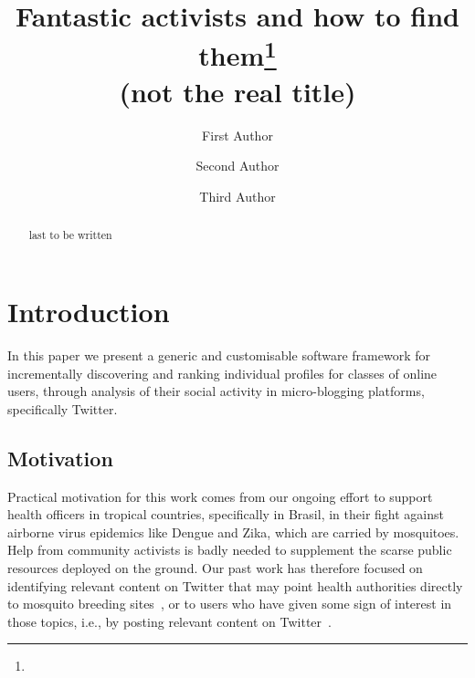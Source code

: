 \documentclass[runningheads]{llncs}
\begin{document}
%
\title{Fantastic activists and how to find them\thanks{} \\ \small (not the real title)}
%
%
\author{First Author \and
Second Author \and
Third Author}
%
%
%
\maketitle              %
%
\begin{abstract}
last to be written
\end{abstract}
%

%
%
\section{Introduction}

In this paper we present a generic and customisable software  framework for incrementally discovering and ranking  individual profiles for classes of online users, through analysis of their social activity in micro-blogging platforms, specifically Twitter.

\subsection{Motivation}  \label{sec:motivation}

Practical motivation for this work comes from our ongoing effort to  support health officers in tropical countries, specifically in Brasil, in their fight against airborne virus epidemics like Dengue and Zika, which are carried by mosquitoes. Help from community activists is badly needed to supplement the scarse public resources deployed on the ground. Our past work has therefore focused on identifying relevant content on Twitter that may point health authorities directly to mosquito breeding sites~\cite{Sousa2018}, or to users who have given some sign of interest in those topics, i.e., by posting relevant content on Twitter~\cite{Missier2017}. 
\end{document}
